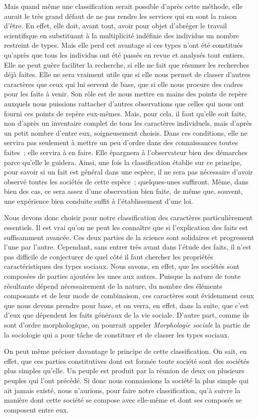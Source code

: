 \documentclass[french,twoside]{book} %
\begin{document}
Mais quand même une classification serait possible d’après cette méthode, elle aurait le très grand défaut de ne pas rendre les services qui en sont la raison d’être. En effet, elle doit, avant tout, avoir pour objet d’abréger le travail scientifique en substituant à la multiplicité indéfinie des individus un nombre restreint de types. Mais elle perd cet avantage si ces types n’ont été constitués qu’après que tous les individus ont été passés en revue et analysés tout entiers. Elle ne peut guère faciliter la recherche, si elle ne fait que résumer les recherches déjà faites. Elle ne sera vraiment utile que si elle nous permet de classer d’autres caractères que ceux qui lui servent de base, que si elle nous procure des cadres pour les faits à venir. Son rôle est de nous mettre en mains des points de repère auxquels nous puissions rattacher d’autres observations que celles qui nous ont fourni ces points de repère eux-mêmes. Mais, pour cela, il faut qu’elle soit faite, non d’après un inventaire complet de tous les caractères individuels, mais d’après un petit nombre d’entre eux, soigneusement choisis. Dans ces conditions, elle ne servira pas seulement à mettre un peu d’ordre dans des connaissances toutes faites ; elle servira à en faire. Elle épargnera à l’observateur bien des démarches parce qu’elle le guidera. Ainsi, une fois la classification établie sur ce principe, pour savoir si un fait est général dans une espèce, il ne sera pas nécessaire d’avoir observé toutes les sociétés de cette espèce ; quelques-unes suffiront. Même, dans bien des cas, ce sera assez d’une observation bien faite, de même que, souvent, une expérience bien conduite suffit à l’établissement d’une loi.\par
Nous devons donc choisir pour notre classification des caractères particulièrement essentiels. Il est vrai qu’on ne peut les connaître que si l’explication des faits est suffisamment avancée. Ces deux parties de la science sont solidaires et progressent l’une par l’autre. Cependant, sans entrer très avant dans l’étude des faits, il n’est pas difficile de conjecturer de quel côté il faut chercher les propriétés caractéristiques des types sociaux. Nous savons, en effet, que les sociétés sont composées de parties ajoutées les unes aux autres. Puisque la nature de toute résultante dépend nécessairement de la nature, du nombre des éléments composants et de leur mode de combinaison, ces caractères sont évidemment ceux que nous devons prendre pour base, et on verra, en effet, dans la suite, que c’est d’eux que dépendent les faits généraux de la vie sociale. D’autre part, comme ils sont d’ordre morphologique, on pourrait appeler \emph{Morphologie sociale} la partie de la sociologie qui a pour tâche de constituer et de classer les types sociaux.\par
On peut même préciser davantage le principe de cette classification. On sait, en effet, que ces parties constitutives dont est formée toute société sont des sociétés plus simples qu’elle. Un peuple est produit par la réunion de deux ou plusieurs peuples qui l’ont précédé. Si donc nous connaissions la société la plus simple qui ait jamais existé, nous n’aurions, pour faire notre classification, qu’à suivre la manière dont cette société se compose avec elle-même et dont ses composés se composent entre eux.
\end{document}
